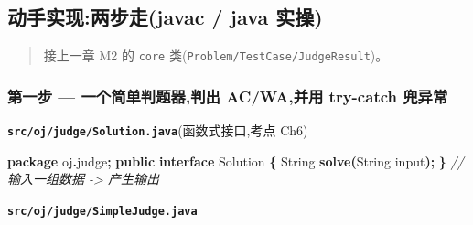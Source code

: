 \documentclass[
  11pt,
]{ctexart}
\newenvironment{Shaded}{\begin{snugshade}}{\end{snugshade}}
\newcommand{\BuiltInTok}[1]{#1}
\newcommand{\CommentTok}[1]{\textcolor[rgb]{0.56,0.35,0.01}{\textit{#1}}}
\newcommand{\FunctionTok}[1]{\textcolor[rgb]{0.13,0.29,0.53}{\textbf{#1}}}
\newcommand{\ImportTok}[1]{#1}
\newcommand{\KeywordTok}[1]{\textcolor[rgb]{0.13,0.29,0.53}{\textbf{#1}}}
\newcommand{\NormalTok}[1]{#1}
\newcommand{\OperatorTok}[1]{\textcolor[rgb]{0.81,0.36,0.00}{\textbf{#1}}}
\begin{document}
\hypertarget{ux52a8ux624bux5b9eux73b0ux4e24ux6b65ux8d70javac-java-ux5b9eux64cd-1}{%
\subsection{动手实现:两步走(javac / java
实操)}\label{ux52a8ux624bux5b9eux73b0ux4e24ux6b65ux8d70javac-java-ux5b9eux64cd-1}}

\begin{quote}
接上一章 M2 的 \texttt{core} 类(\texttt{Problem/TestCase/JudgeResult})。
\end{quote}

\hypertarget{ux7b2cux4e00ux6b65-ux4e00ux4e2aux7b80ux5355ux5224ux9898ux5668ux5224ux51fa-acwaux5e76ux7528-try-catch-ux515cux5f02ux5e38}{%
\subsubsection{\texorpdfstring{第一步 \KS --- 一个简单判题器,判出
AC/WA,并用 try-catch
兜异常}{第一步 --- 一个简单判题器,判出 AC/WA,并用 try-catch 兜异常}}\label{ux7b2cux4e00ux6b65-ux4e00ux4e2aux7b80ux5355ux5224ux9898ux5668ux5224ux51fa-acwaux5e76ux7528-try-catch-ux515cux5f02ux5e38}}

\textbf{\texttt{src/oj/judge/Solution.java}}(函数式接口,考点 Ch6)

\begin{Shaded}
\begin{Highlighting}[]
\KeywordTok{package}\ImportTok{ oj}\OperatorTok{.}\ImportTok{judge}\OperatorTok{;}
\KeywordTok{public} \KeywordTok{interface}\NormalTok{ Solution }\OperatorTok{\{} \BuiltInTok{String} \FunctionTok{solve}\OperatorTok{(}\BuiltInTok{String}\NormalTok{ input}\OperatorTok{);} \OperatorTok{\}}   \CommentTok{// 输入一组数据 {-}\textgreater{} 产生输出}
\end{Highlighting}
\end{Shaded}

\textbf{\texttt{src/oj/judge/SimpleJudge.java}}
\end{document}
